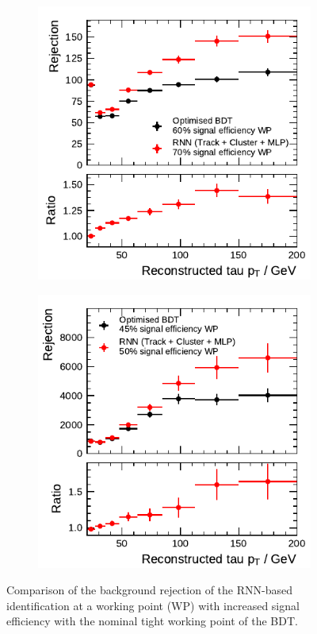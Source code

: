 \begin{figure}[htbp]
  \begin{subfigure}[t]{0.48\textwidth}
    \centering
    \includegraphics{./figures/rnn/combined/rnn_loosened_tight_1p.pdf}
  \end{subfigure}\hfill
  \begin{subfigure}[t]{0.48\textwidth}
    \centering
    \includegraphics{./figures/rnn/combined/rnn_loosened_tight_3p.pdf}
  \end{subfigure}
  \caption[Background rejection at a working point with increased signal
  efficiency for the RNN-based identification]{Comparison of the background
    rejection of the RNN-based identification at a working point (WP) with
    increased signal efficiency with the nominal tight working point of the
    BDT.}
  \label{fig:loosened_wp}
\end{figure}

